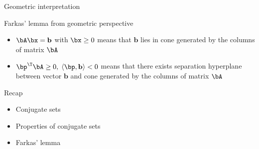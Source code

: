 \documentclass[12pt]{beamer}
\begin{document}
\begin{frame}{Geometric interpretation}
\begin{block}{Farkas' lemma from geometric perspective}
\begin{itemize}
\item $\bA\bx = \mathbf{b}$ with $\bx \geq 0$ means that $\mathbf{b}$ lies in cone generated by the columns of matrix $\bA$
\item $\bp^{\T}\bA \geq 0, \; \langle \bp, \mathbf{b} \rangle < 0$ means that there exists separation hyperplane between vector $\mathbf{b}$ and cone generated by the columns of matrix $\bA$
\end{itemize}
\end{block}
\end{frame}

\begin{frame}{Recap}
\begin{itemize}
\item Conjugate sets
\item Properties of conjugate sets
\item Farkas' lemma
\end{itemize}

\end{frame}
\end{document}
